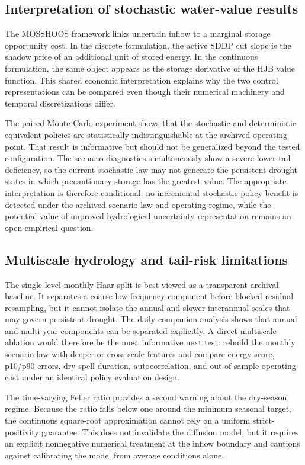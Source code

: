\documentclass[11pt,a4paper]{article}
\begin{document}
\subsection{Interpretation of stochastic water-value results}
The MOSSHOOS framework links uncertain inflow to a marginal storage opportunity
cost. In the discrete formulation, the active SDDP cut slope is the shadow price of
an additional unit of stored energy. In the continuous formulation, the same object
appears as the storage derivative of the HJB value function. This shared economic
interpretation explains why the two control representations can be compared even
though their numerical machinery and temporal discretizations differ.

The paired Monte Carlo experiment shows that the stochastic and
deterministic-equivalent policies are statistically indistinguishable at the archived
operating point. That result is informative but should not be generalized beyond the
tested configuration. The scenario diagnostics simultaneously show a severe lower-tail
deficiency, so the current stochastic law may not generate the persistent drought
states in which precautionary storage has the greatest value. The appropriate
interpretation is therefore conditional: no incremental stochastic-policy benefit is
detected under the archived scenario law and operating regime, while the potential
value of improved hydrological uncertainty representation remains an open empirical
question.

\subsection{Multiscale hydrology and tail-risk limitations}
The single-level monthly Haar split is best viewed as a transparent archival baseline.
It separates a coarse low-frequency component before blocked residual resampling, but
it cannot isolate the annual and slower interannual scales that may govern persistent
drought. The daily companion analysis \cite{affognon2026wavelet} shows that annual and
multi-year components can be separated explicitly. A direct multiscale ablation would
therefore be the most informative next test: rebuild the monthly scenario law with
deeper or cross-scale features and compare energy score, p10/p90 errors, dry-spell
duration, autocorrelation, and out-of-sample operating cost under an identical policy
evaluation design.

The time-varying Feller ratio provides a second warning about the dry-season regime.
Because the ratio falls below one around the minimum seasonal target, the continuous
square-root approximation cannot rely on a uniform strict-positivity guarantee. This
does not invalidate the diffusion model, but it requires an explicit nonnegative
numerical treatment at the inflow boundary and cautions against calibrating the model
from average conditions alone.
\end{document}
